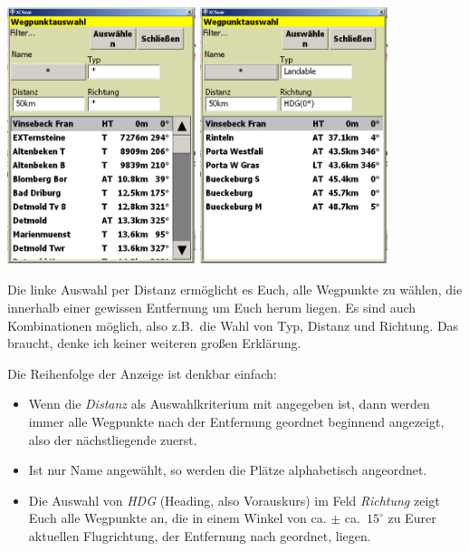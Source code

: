 \begin{center}
\blink~\\

\includegraphics[width=5.5cm]{Bilder/WegpunktauswahlDistanz.png}\qquad
\includegraphics[width=5.5cm]{Bilder/WegpunktauswahlTypRichtungDistanz.png}
\end{center}

Die linke Auswahl per \textsf{Distanz} ermöglicht es Euch, alle Wegpunkte zu wählen, die innerhalb einer gewissen Entfernung um Euch herum liegen. Es sind auch Kombinationen möglich, also z.B.\ die Wahl von \textsf{Typ}, \textsf{Distanz} und \textsf{Richtung}. Das braucht, denke ich keiner weiteren großen Erklärung.

Die Reihenfolge der Anzeige ist denkbar einfach:
\begin{itemize}\i
\item Wenn die \textsl{Distanz} als Auswahlkriterium mit angegeben ist, dann werden immer alle Wegpunkte nach der Entfernung geordnet beginnend angezeigt, also der nächstliegende zuerst.
\item Ist nur \textsf{Name} angewählt, so werden die Plätze alphabetisch angeordnet.
\item Die Auswahl von \textsl{HDG} (Heading, also Vorauskurs) im Feld \textsl{Richtung} zeigt Euch alle Wegpunkte an, die in einem Winkel von ca. $\pm$ ca.\ $15^\circ$ zu Eurer aktuellen Flugrichtung, der Entfernung nach geordnet, liegen.
\end{itemize}

